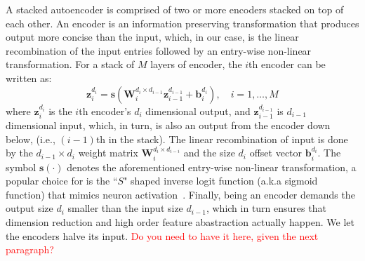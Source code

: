 \documentclass[11pt]{article}
\newcommand{\vecEC}[1]{\boldsymbol{#1}}
\newcommand{\WEC}{\vecEC{W}}                   %
\newcommand{\WEI}[3]{\WEC_{#1}^{d_{#2} \times d_{#3}}} %
\newcommand{\bEC}{\vecEC{b}}    %
\newcommand{\bEI}[2]{\bEC_{#1}^{d_{#2}}} %
\newcommand{\zEC}{\vecEC{z}}
\newcommand{\zEI}[2]{\zEC_{#1}^{d_{#2}}}
\begin{document}
A stacked autoencoder is comprised of two or more encoders stacked on top of each other. An encoder is an information preserving transformation that produces output more concise than the input, which, in our case, is the linear recombination of the input entries followed by an entry-wise non-linear transformation. For a stack of $M$ layers of encoder, the $i$th encoder can be written as:
\begin{equation} \label{eq:AE}
  \zEC_i^{d_i} = \boldsymbol{s}(\WEI{i}{i}{i-1} \zEI{i-1}{i-1} + \bEI{i}{i}), \quad i = 1, \ldots, M
\end{equation}
where $\zEI{i}{i}$ is the $i$th encoder's $d_i$ dimensional output, and $\zEI{i-1}{i-1}$ is $d_{i-1}$ dimensional input, which, in turn, is also an output from the encoder down below, (i.e., $(i-1)$th in the stack). The linear recombination of input is done by the $d_{i-1} \times d_i$ weight matrix $\WEI{i}{i}{i-i}$ and the size $d_i$ offset vector $\bEI{i}{i}$. The symbol $\boldsymbol{s}(\cdot)$ denotes the aforementioned entry-wise non-linear transformation, a popular choice for is the ``$S$" shaped inverse logit function (a.k.a sigmoid function) that mimics neuron activation~\cite{SGM1, NNE90}. Finally, being an encoder demands the output size $d_i$ smaller than the input size $d_{i-1}$, which in turn ensures that dimension reduction and high order feature abastraction actually happen. We let the encoders halve its input. \textcolor{red}{Do you need to have it here, given the next paragraph?}
\end{document}
